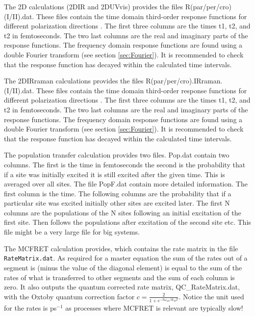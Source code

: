 The 2D calculations (2DIR and 2DUVvis) provides the files R(par/per/cro)(I/II).dat. These files contain the time domain
third-order response functions for different polarization directions \cite{Hochstrasser.2001.CP.266.273,Zanni.2001.PNAS.98.11265}.
The first three columns are the times t1, t2, and t2 in femtoseconds.
The two last columns are the real and imaginary parts of the response functions. The frequency domain
response functions are found using a double Fourier transform (see section \ref{sec:Fourier}).
It is recommended to check that the response function has decayed within the calculated time intervals.

The 2DIRraman calculations provides the files R(par/per/cro).IRraman.(I/II).dat. These files contain the time domain
third-order response functions for different polarization directions \cite{Hochstrasser.2001.CP.266.273,Zanni.2001.PNAS.98.11265}.
The first three columns are the times t1, t2, and t2 in femtoseconds.
The two last columns are the real and imaginary parts of the response functions. The frequency domain
response functions are found using a double Fourier transform (see section \ref{sec:Fourier}).
It is recommended to check that the response function has decayed within the calculated time intervals. 


The population transfer calculation provides two files. Pop.dat contain two columns. The first is the
time in femtoseconds the second is the probability that if a site was initially excited it is still excited
after the given time. This is averaged over all sites. The file PopF.dat contain more detailed information.
The first column is the time. The following columns are the probability that if a particular site was excited
initially other sites are excited later. The first N columns are the populations of the N sites following an initial excitation of the first site. Then follows the populations after excitation of the second site etc. This file might be a very large file for big systems.

The MCFRET calculation provides, which contains the rate matrix in the file  {\tt RateMatrix.dat}. As required for a master equation the sum of the rates out of a segment is (minus the value of the diagonal element) is equal to the sum of the rates of what is transferred to other segments and the sum of each column is zero. It also outputs the quantum corrected rate matrix, QC\_RateMatrix.dat, with the Oxtoby quantum correction factor $c = \frac{2}{1+e^{-\hbar \omega_{ab}/K_BT}}$. Notice the unit used for the rates is ps$^{-1}$ as processes where MCFRET is relevant are typically slow!

